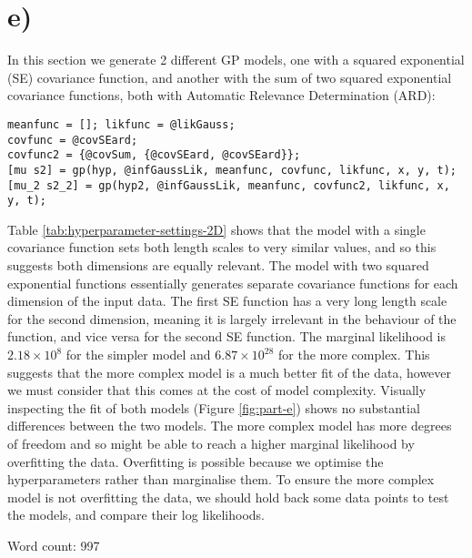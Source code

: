 \documentclass[11pt]{report}
\begin{document}
\section*{e) }

In this section we generate 2 different GP models, one with a squared exponential (SE) covariance function, and another with the sum of two squared exponential covariance functions, both with Automatic Relevance Determination (ARD):
\begin{lstlisting}[basicstyle=\listingsfont]
meanfunc = []; likfunc = @likGauss;
covfunc = @covSEard;
covfunc2 = {@covSum, {@covSEard, @covSEard}};
[mu s2] = gp(hyp, @infGaussLik, meanfunc, covfunc, likfunc, x, y, t);
[mu_2 s2_2] = gp(hyp2, @infGaussLik, meanfunc, covfunc2, likfunc, x, y, t);
\end{lstlisting}
Table \ref{tab:hyperparameter-settings-2D} shows that the model with a single covariance function sets both length scales to very similar values, and so this suggests both dimensions are equally relevant. The model with two squared exponential functions essentially generates separate covariance functions for each dimension of the input data. The first SE function has a very long length scale for the second dimension, meaning it is largely irrelevant in the behaviour of the function, and vice versa for the second SE function. The marginal likelihood is $2.18 \times 10^{8}$ for the simpler model and $6.87 \times 10^{28}$ for the more complex. This suggests that the more complex model is a much better fit of the data, however we must consider that this comes at the cost of model complexity. Visually inspecting the fit of both models (Figure \ref{fig:part-e}) shows no substantial differences between the two models. The more complex model has more degrees of freedom and so might be able to reach a higher marginal likelihood by overfitting the data. Overfitting is possible because we optimise the hyperparameters rather than marginalise them. To ensure the more complex model is not overfitting the data, we should hold back some data points to test the models, and compare their log likelihoods. \newline

\noindent
Word count: 997
\end{document}
